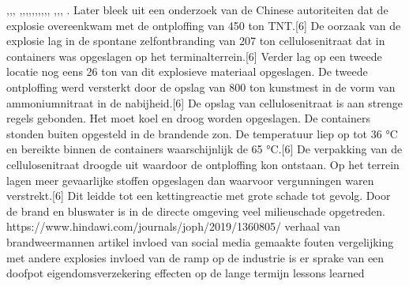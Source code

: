\cite{aria12082015explosionaTanjin},\cite{tremblay11022016chineseInvestigatorsTanjin},\cite{taylor13082015TanjinExplosianAftermath},
\cite{associatedPresss13082013},\cite{un20082015InvestigationTanjin},\cite{france2412082015TnjinExplosion},\cite{npr14082015TanjinCause},\cite{bbc05022016TanjinResponsibles},\cite{CBodeen15082015TanjinExplosion},\cite{reutersTanjinInsurance},\cite{yu082016evaluationTanjin2015},\cite{wiki2015TanjinExplosions},\cite{bbc17082015whathappenedTanjin},
\cite{mortimer19082016taijinexplosioncrater},\cite{internationallabourofficeChmControlTooliit},\cite{euTaxationCustomsICSC},
\cite{iloWHOChemSafetyCards}.
Later bleek uit een onderzoek van de Chinese autoriteiten dat de explosie overeenkwam met de ontploffing van 450 ton TNT.[6] 
De oorzaak van de explosie lag in de spontane zelfontbranding van 207 ton cellulosenitraat dat in containers was opgeslagen op het terminalterrein.[6] 
Verder lag op een tweede locatie nog eens 26 ton van dit explosieve materiaal opgeslagen.
De tweede ontploffing werd versterkt door de opslag van 800 ton kunstmest in de vorm van ammoniumnitraat in de nabijheid.[6]
De opslag van cellulosenitraat is aan strenge regels gebonden. Het moet koel en droog worden opgeslagen. De containers stonden buiten opgesteld in de brandende zon. De temperatuur liep op tot 36 °C en bereikte binnen de containers waarschijnlijk de 65 °C.[6] De verpakking van de cellulosenitraat droogde uit waardoor de ontploffing kon ontstaan. Op het terrein lagen meer gevaarlijke stoffen opgeslagen dan waarvoor vergunningen waren verstrekt.[6] Dit leidde tot een kettingreactie met grote schade tot gevolg. Door de brand en bluswater is in de directe omgeving veel milieuschade opgetreden.
https://www.hindawi.com/journals/joph/2019/1360805/ 
\cite{jiang16042019TanjinExplosion}
verhaal van brandweermannen
\cite{staff31082015tanjinblastunrevealed}
artikel
\cite{chinafile18082015tanjinexplosion}
invloed van social media
\cite{pinghuang2410201TanjinFactreport}
gemaakte fouten
\cite{portoTanjinExplosionSight}
\cite{imago17082015TanjinApartmentImages}
\cite{trager14082015Chemicalblast}
\cite{pangeramo27082015TanjinExplosion}
vergelijking met andere explosies
\cite{ap06082020ammaniumnitrate}
invloed van de ramp op de industrie
\cite{morris14082015TanjinIndustryImpact}
is er sprake van een doofpot
\cite{milesyu20082015exposingtoxicgovlines}
eigendomsverzekering
\cite{artemis30032016tanjininsurance}
\cite{aidenxiatanjinblast}
effecten op de lange termijn
\cite{danwangTanjinflexreport}
\cite{keyHighlightsTanjin}
lessons learned
\cite{hartley13082015videofootage}
